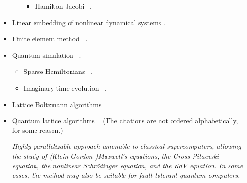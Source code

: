 \documentclass[12pt,letterpaper]{article}
\newcommand{\red}[1]{{\color{red}(#1)}}
\begin{document}
\begin{itemize}
\begin{itemize}
\begin{itemize}
                \item Hamilton-Jacobi  ~\cite{jinTimeComplexityAnalysis2022,jinQuantumAlgorithmsComputing2022}.
            \end{itemize}
		\end{itemize}

    \item Linear embedding of nonlinear dynamical systems   \cite{Engel2021_doi:10.1063/5.0040313,jinTimeComplexityAnalysis2022}.

    \item Finite element method  ~\cite{montanaroQuantumAlgorithmsFinite2016}.
  
	\item Quantum simulation  ~\cite{berryHamiltonianSimulationNearly2015}.
		\begin{itemize}
            \item Sparse Hamiltonians  ~\cite{berryEfficientQuantumAlgorithms2007,berryExponentialImprovementPrecision2014}.
			\item Imaginary time evolution ~\cite{mcardle_variational_2019}.
		\end{itemize}

    \item Lattice Boltzmann algorithms ~~\cite{budinski_quantum_2021}
    
    \item Quantum lattice algorithms  ~\cite{andersonCommentsUnitaryQubit2022,koukoutsisDysonMapsUnitary2022,oganesovEffectFourierTransform2018,ramReflectionTransmissionElectromagnetic2021,vahalaBuildingThreedimensionalQuantum2020,vahalaEffectPauliSpin2020,vahalaOneTwodimensionalQuantum2021,vahalaOneTwodimensionalQuantum2021a,vahalaQuantumLatticeRepresentation2022a,vahalaQubitUnitaryLattice2020,vahalaQubitUnitaryLattice2020a,vahalaTwoDimensionalElectromagnetic2021,vahalaUnitaryQuantumLattice2020,vahalaUnitaryQubitLattice2019,vahala_vahala_soe_ram_2020,yepezEfficientAccurateQuantum2002,yepezRelativisticPathIntegral2005,yepezQuantumLatticeGas2016,vahalaQuantumLatticeGas2003,vahalaUnitaryQubitLattice2011,vahalaUnitaryQuantumLattice2010,oganesovBenchmarkingDiracgeneratedUnitary2016,oganesovImaginaryTimeIntegration2016,oganesovUnitaryQuantumLattice2015,Shi2018_PhysRevE.97.053206,andersonCommentsUnitaryQubit2023} \red{The citations are not ordered alphabetically, for some reason.}
    
    \textit{Highly parallelizable approach amenable to classical supercomputers, allowing the study of (Klein-Gordon-)Maxwell's equations, the Gross-Pitaevski equation, the nonlinear Schrödinger equation, and the KdV equation. In some cases, the method may also be suitable for fault-tolerant quantum computers.}

\end{itemize}

\printbibliography
\end{document}
